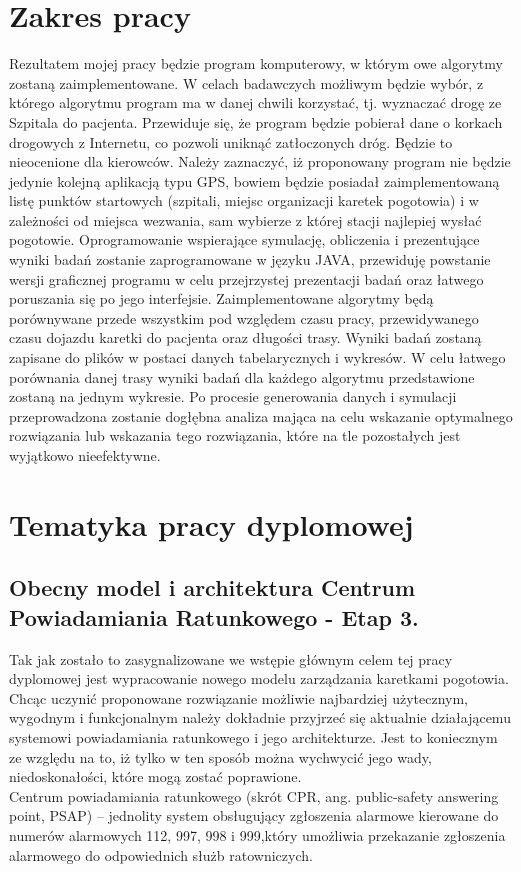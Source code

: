 \documentclass[12pt]{article} %
\begin{document}
\section{Zakres pracy}
Rezultatem mojej pracy będzie program komputerowy, w którym owe algorytmy zostaną zaimplementowane. W celach badawczych możliwym będzie wybór, z którego algorytmu program ma w danej chwili korzystać, tj. wyznaczać drogę ze Szpitala do pacjenta. Przewiduje się, że program będzie pobierał dane o korkach drogowych z Internetu, co pozwoli uniknąć zatłoczonych dróg. Będzie to nieocenione dla kierowców. Należy zaznaczyć, iż proponowany program nie będzie jedynie kolejną aplikacją typu GPS, bowiem będzie posiadał zaimplementowaną listę punktów startowych (szpitali, miejsc organizacji karetek pogotowia) i w zależności od miejsca wezwania, sam wybierze z której stacji najlepiej wysłać pogotowie.
Oprogramowanie wspierające symulację, obliczenia i prezentujące wyniki badań zostanie zaprogramowane w języku JAVA, przewiduję powstanie wersji graficznej programu w celu przejrzystej prezentacji badań oraz łatwego poruszania się po jego interfejsie.
Zaimplementowane algorytmy będą porównywane przede wszystkim pod względem czasu pracy, przewidywanego czasu dojazdu karetki do pacjenta oraz długości trasy. Wyniki badań zostaną zapisane do plików w postaci danych tabelarycznych i wykresów. W celu łatwego porównania danej trasy wyniki badań dla każdego algorytmu przedstawione zostaną na jednym wykresie.
Po procesie generowania danych i symulacji przeprowadzona zostanie dogłębna analiza mająca na celu wskazanie optymalnego rozwiązania lub wskazania tego rozwiązania, które na tle pozostałych jest wyjątkowo nieefektywne.
\section{Tematyka pracy dyplomowej}

\subsection{Obecny model i architektura Centrum Powiadamiania Ratunkowego - Etap 3.}
Tak jak zostało to zasygnalizowane we wstępie głównym celem tej pracy dyplomowej jest wypracowanie nowego modelu zarządzania karetkami pogotowia. Chcąc uczynić proponowane rozwiązanie możliwie najbardziej użytecznym, wygodnym i funkcjonalnym należy dokładnie przyjrzeć się aktualnie działającemu systemowi powiadamiania ratunkowego i jego architekturze. Jest to koniecznym ze względu na to, iż tylko w ten sposób można wychwycić jego wady, niedoskonałości, które mogą zostać poprawione.\\
Centrum powiadamiania ratunkowego (skrót CPR, ang. public-safety answering point, PSAP) – jednolity system obsługujący zgłoszenia alarmowe kierowane do numerów alarmowych 112, 997, 998 i 999,który  umożliwia przekazanie zgłoszenia alarmowego do odpowiednich służb ratowniczych. 
\end{document}
